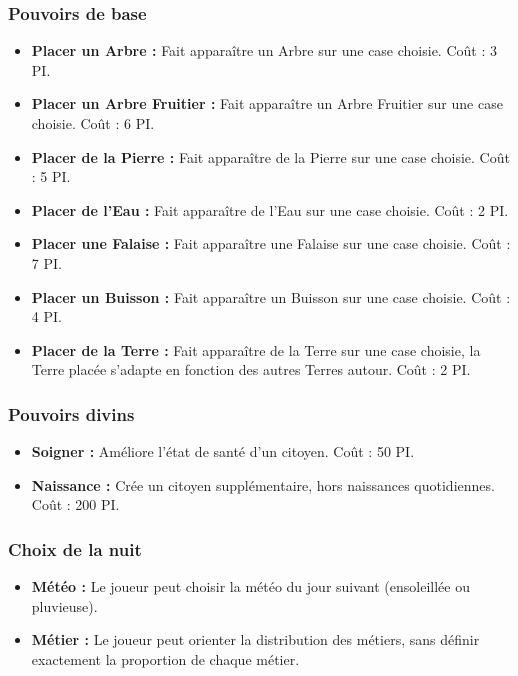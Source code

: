 \documentclass[a4paper]{article}
\begin{document}
        \subsubsection{Pouvoirs de base}
          \begin{itemize} \small
            \item \textbf{Placer un Arbre :} Fait apparaître un Arbre sur une case choisie. Coût : 3 PI.
            \item \textbf{Placer un Arbre Fruitier :} Fait apparaître un Arbre Fruitier sur une case choisie. Coût : 6 PI.
            \item \textbf{Placer de la Pierre :} Fait apparaître de la Pierre sur une case choisie. Coût : 5 PI.
            \item \textbf{Placer de l'Eau :} Fait apparaître de l'Eau sur une case choisie. Coût : 2 PI.
            \item \textbf{Placer une Falaise :} Fait apparaître une Falaise sur une case choisie. Coût : 7 PI.
            \item \textbf{Placer un Buisson :} Fait apparaître un Buisson sur une case choisie. Coût : 4 PI.
            \item \textbf{Placer de la Terre :} Fait apparaître de la Terre sur une case choisie, la Terre placée s'adapte en fonction des autres Terres autour. Coût : 2 PI.
          \end{itemize} \normalsize

        \subsubsection{Pouvoirs divins}
          \begin{itemize} \small
            \item \textbf{Soigner :} Améliore l'état de santé d'un citoyen. Coût : 50 PI.
            \item \textbf{Naissance :} Crée un citoyen supplémentaire, hors naissances quotidiennes. Coût : 200 PI.
          \end{itemize} \normalsize

        \subsubsection{Choix de la nuit}
          \begin{itemize} \small
            \item \textbf{Météo :} Le joueur peut choisir la météo du jour suivant (ensoleillée ou pluvieuse).
            \item \textbf{Métier :} Le joueur peut orienter la distribution des métiers, sans définir exactement la proportion de chaque métier.
          \end{itemize} \normalsize
    
\end{document}
